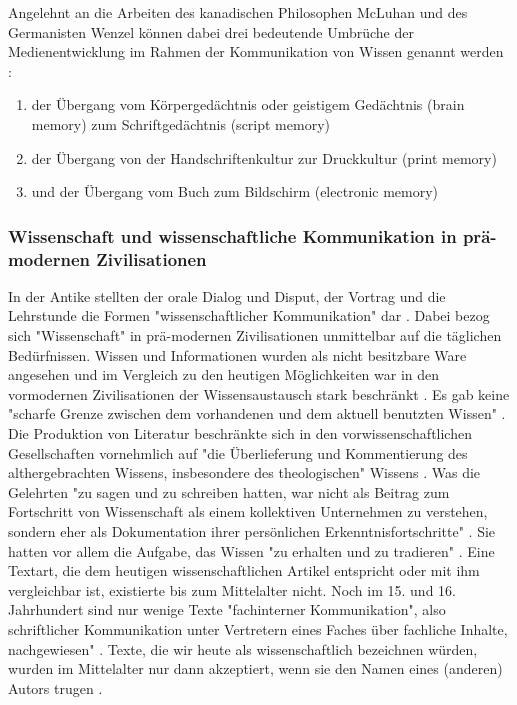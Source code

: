Angelehnt an die Arbeiten des kanadischen Philosophen McLuhan und des Germanisten Wenzel können dabei drei bedeutende Umbrüche der Medienentwicklung im Rahmen der Kommunikation von Wissen genannt werden \cite{Wunderlich_2008} \cite{Wenzel_2007}:
\begin{enumerate}
\item der Übergang vom Körpergedächtnis oder geistigem Gedächtnis (brain memory) zum Schriftgedächtnis (script memory)
\item der Übergang von der Handschriftenkultur zur Druckkultur (print memory)
\item und der Übergang vom Buch zum Bildschirm (electronic memory)
\end{enumerate}

\subsubsection{Wissenschaft und wissenschaftliche Kommunikation in prä-modernen Zivilisationen}

In der Antike stellten der orale Dialog und Disput, der Vortrag und die Lehrstunde die Formen "wissenschaftlicher Kommunikation" dar \cite{Hollricher_2009}. Dabei bezog sich "Wissenschaft" in prä-modernen Zivilisationen unmittelbar auf die täglichen Bedürfnissen. Wissen und Informationen wurden als nicht besitzbare Ware angesehen \cite{May_2006} \cite{Steiner_1998} und im Vergleich zu den heutigen Möglichkeiten war in den vormodernen Zivilisationen der Wissensaustausch stark beschränkt \cite{Hollricher_2009}. Es gab keine "scharfe Grenze zwischen dem vorhandenen und dem aktuell benutzten Wissen" \cite[:161]{Luhmann_1998}. Die Produktion von Literatur beschränkte sich in den vorwissenschaftlichen Gesellschaften vornehmlich auf "die Überlieferung und Kommentierung des althergebrachten Wissens, insbesondere des theologischen" Wissens \cite{Steiner_1998}. Was die Gelehrten "zu sagen und zu schreiben hatten, war nicht als Beitrag zum Fortschritt von Wissenschaft als einem kollektiven Unternehmen zu verstehen, sondern eher als Dokumentation ihrer persönlichen Erkenntnisfortschritte" \cite{Graefen_2007}. Sie hatten vor allem die Aufgabe, das Wissen "zu erhalten und zu tradieren" \cite[:148]{Luhmann_1998}. Eine Textart, die dem heutigen wissenschaftlichen Artikel entspricht oder mit ihm vergleichbar ist, existierte bis zum Mittelalter nicht. Noch im 15. und 16. Jahrhundert sind nur wenige Texte "fachinterner Kommunikation", also schriftlicher Kommunikation unter Vertretern eines Faches über fachliche Inhalte, nachgewiesen" \cite{Graefen_2007}. Texte, die wir heute als wissenschaftlich bezeichnen würden, wurden im Mittelalter nur dann akzeptiert, wenn sie den Namen eines (anderen) Autors trugen \cite{Foucault_2000}.

